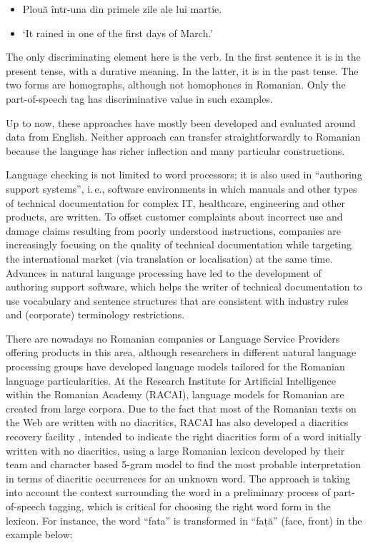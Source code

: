 \documentclass[]{../../metanetpaper}
\begin{document}
\begin{multicols}{2}
\begin{example}
\begin{itemize}
\item []Plouă într-una din primele zile ale lui martie.
\item []`It rained in one of the first days of March.'
\end{itemize}
\end{example}

The only discriminating element here is the verb. In the first sentence it is in the present tense, with a durative meaning. In the latter, it is in the past tense. The two forms are homographs, although not homophones in Romanian. Only the part-of-speech tag has discriminative value in such examples.

Up to now, these approaches have mostly been developed and evaluated around data from English. Neither approach can transfer straightforwardly to Romanian because the language has richer inflection and many particular constructions.


Language checking is not limited to word processors; it is also used in “authoring support systems”, i.\,e., software environments in which manuals and other types of technical documentation for complex IT, healthcare, engineering and other products, are written. To offset customer complaints about incorrect use and damage claims resulting from poorly understood instructions, companies are increasingly focusing on the quality of technical documentation while targeting the international market (via translation or localisation) at the same time. Advances in natural language processing have led to the development of authoring support software, which helps the writer of technical documentation to use vocabulary and sentence structures that are consistent with industry rules and (corporate) terminology restrictions.

There are nowadays no Romanian companies or Language Service Providers offering products in this area, although researchers in different natural language processing groups have developed language models tailored for the Romanian language particularities. At the Research Institute for Artificial Intelligence within the Romanian Academy (RACAI), language models for Romanian are created from large corpora. Due to the fact that most of the Romanian texts on the Web are written with no diacritics, RACAI has also developed a diacritics recovery facility \cite{DIAC}, intended to indicate the right diacritics form of a word initially written with no diacritics, using a large Romanian lexicon developed by their team and character based 5-gram model to find the most probable interpretation in terms of diacritic occurrences for an unknown word. The approach is taking into account the context surrounding the word in a preliminary process of part-of-speech tagging, which is critical for choosing the right word form in the lexicon. For instance, the word “fata” is transformed in “față” (face, front) in the example below:


\end{multicols}
\end{document}
